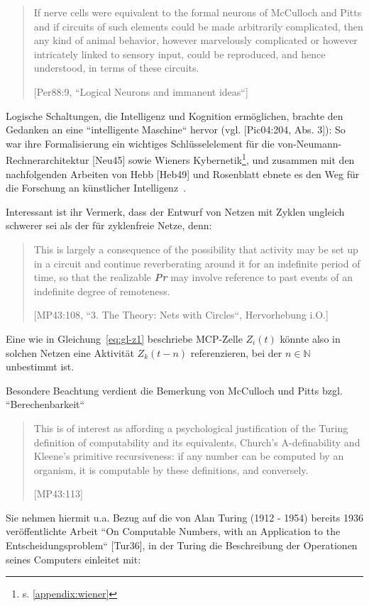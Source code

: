 {\blockquote[{[Per88:9, ``Logical Neurons and immanent ideas``]}]{
If nerve cells were equivalent to the formal neurons of McCulloch and Pitts and if circuits of such elements could be made arbitrarily complicated, then any kind of animal behavior, however marvelously complicated or however intricately linked to sensory input, could be reproduced, and hence understood, in terms of these circuits.
}

Logische Schaltungen, die Intelligenz und Kognition ermöglichen, brachte den Gedanken an eine ``intelligente Maschine`` hervor (vgl. [Pic04:204, Abs. 3]): So war ihre Formalisierung ein wichtiges Schlüsselelement für die von-Neumann-Rechnerarchitektur [Neu45] sowie Wieners Kybernetik\footnote{s. \ref{appendix:wiener}}, und zusammen mit den nachfolgenden Arbeiten von Hebb [Heb49] und Rosenblatt ebnete es den Weg für die Forschung an künstlicher Intelligenz~\cite[1]{Arb19}.

\noindent
Interessant ist ihr Vermerk, dass der Entwurf von Netzen mit Zyklen ungleich schwerer sei als der für zyklenfreie Netze, denn:

\blockquote[{[MP43:108, ``3. The Theory: Nets with Circles``, Hervorhebung i.O.]}]{
 This is largely a consequence of the possibility that activity may be set up in a circuit and continue reverberating around it for an indefinite period of time, so that the realizable \textbf{\textit{Pr}} may involve reference to past events of an indefinite degree of remoteness.
}

\noindent
Eine wie in Gleichung~\ref{eq:gl-z1} beschriebe MCP-Zelle $Z_i(t)$ könnte also in solchen Netzen eine Aktivität $Z_k(t-n)$ referenzieren, bei der $n \in \mathbb{N}$ unbestimmt ist.

\noindent
Besondere Beachtung verdient die Bemerkung von McCulloch und Pitts bzgl. ``Berechenbarkeit``

\blockquote[{[MP43:113]}]{
This is of interest as affording a psychological justification of the Turing definition of computability and its equivalents, Church’s A-definability and Kleene’s primitive recursiveness: if any number can be computed by an organism, it is computable by these definitions, and conversely.
}

\noindent
Sie nehmen hiermit u.a. Bezug auf die von Alan Turing (1912 - 1954) bereits 1936 veröffentlichte Arbeit ``On Computable Numbers, with an Application to the Entscheidungsproblem`` [Tur36], in der Turing die Beschreibung der Operationen seines Computers einleitet mit:

}
